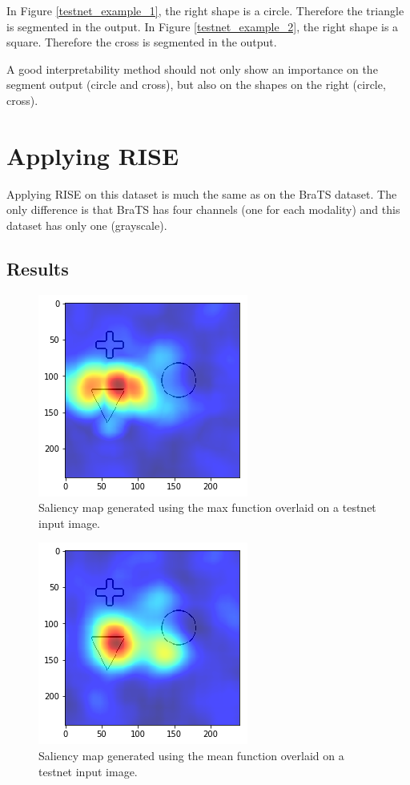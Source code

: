 In Figure \ref{testnet_example_1}, the right shape is a circle. Therefore the triangle is segmented in the output.
In Figure \ref{testnet_example_2}, the right shape is a square. Therefore the cross is segmented in the output.

A good interpretability method should not only show an importance on the segment output (circle and cross), but also on the shapes on the right (circle, cross).

\section{Applying RISE}

Applying RISE on this dataset is much the same as on the BraTS dataset. The only difference is that BraTS has four channels (one for each modality) and this dataset has only one (grayscale).

\subsection{Results}

\begin{figure}[H]
    \centering
    \includegraphics[width=.5\linewidth]{chapters/05_testnet/images/rise_max.png}
    \caption{Saliency map generated using the max function overlaid on a testnet input image.}
    \label{testnet_rise_mean}
\end{figure}

\begin{figure}[H]
    \centering
    \includegraphics[width=.5\linewidth]{chapters/05_testnet/images/rise_mean.png}
    \caption{Saliency map generated using the mean function overlaid on a testnet input image.}
    \label{testnet_rise_max}
\end{figure}

